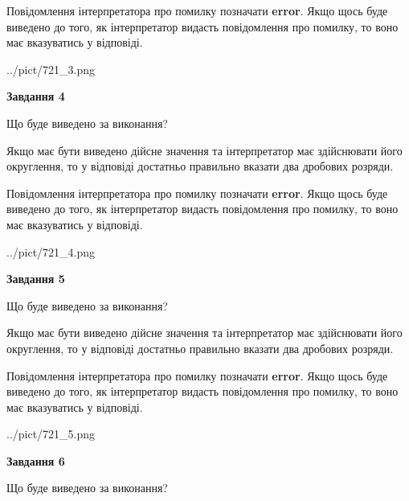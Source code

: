 \documentclass[12pt, ukrainian]{article}
\begin{document}
{\begin {Large}
Повідомлення інтерпретатора про помилку позначати \textbf{error}.
Якщо щось буде виведено до того, як інтерпретатор видасть повідомлення про помилку, 
то воно має вказуватись у відповіді. \par

\begin{center}
	{../pict/721_3.png}
\end{center}
\newpage

{\begin {center}\textbf{Завдання 4}\end {center}}\par
Що буде виведено за виконання? \par

Якщо має бути виведено дійсне значення та інтерпретатор має здійснювати його округлення, 
то у відповіді достатньо правильно вказати два дробових розряди.

Повідомлення інтерпретатора про помилку позначати \textbf{error}.
Якщо щось буде виведено до того, як інтерпретатор видасть повідомлення про помилку, 
то воно має вказуватись у відповіді. \par

\begin{center}
	{../pict/721_4.png}
\end{center}
\newpage

{\begin {center}\textbf{Завдання 5}\end {center}}\par
Що буде виведено за виконання? \par

Якщо має бути виведено дійсне значення та інтерпретатор має здійснювати його округлення, 
то у відповіді достатньо правильно вказати два дробових розряди.

Повідомлення інтерпретатора про помилку позначати \textbf{error}.
Якщо щось буде виведено до того, як інтерпретатор видасть повідомлення про помилку, 
то воно має вказуватись у відповіді. \par

\begin{center}
	{../pict/721_5.png}
\end{center}
\newpage

{\begin {center}\textbf{Завдання 6}\end {center}}\par
Що буде виведено за виконання? \par


\end{Large}}
\end{document}
